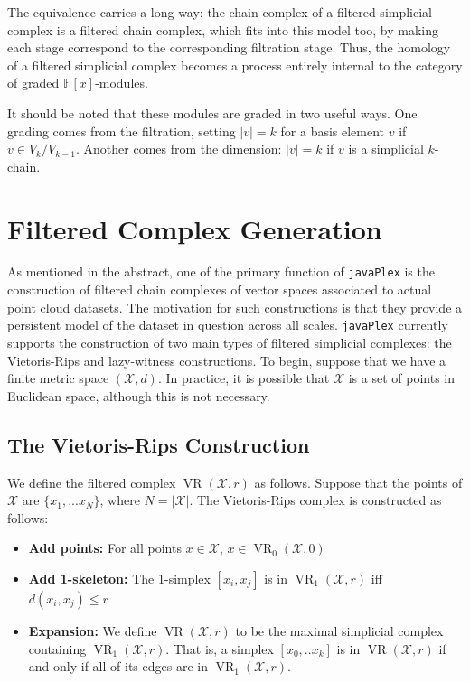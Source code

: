 \documentclass{gts2012}
\newcommand\javaPlex{\texttt{javaPlex}\xspace}
\newcommand{\VR}{\operatorname{VR}}
\begin{document}
The equivalence carries a long way: the chain complex of a filtered
simplicial complex is a filtered chain complex, which fits into this
model too, by making each stage correspond to the corresponding
filtration stage. Thus, the homology of a filtered simplicial complex
becomes a process entirely internal to the category of graded $\mathbb{F}[x]$-modules.

It should be noted that these modules are graded in two useful ways. One grading
comes from the filtration, setting $|v|=k$ for a basis element $v$ if
$v\in V_k/V_{k-1}$. Another comes from the dimension: $|v|=k$ if $v$
is a simplicial $k$-chain.



\section{Filtered Complex Generation}

As mentioned in the abstract, one of the primary function of \javaPlex is the construction of filtered chain complexes of vector spaces associated to actual point cloud datasets. The motivation for such constructions is that they provide a persistent model of the dataset in question across all scales. \javaPlex currently supports the construction of two main types of filtered simplicial complexes: the Vietoris-Rips and lazy-witness constructions. To begin, suppose that we have a finite metric space $(\mathcal{X}, d)$. In practice, it is possible that $\mathcal{X}$ is a set of points in Euclidean space, although this is not necessary.

\subsection{The Vietoris-Rips Construction}
We define the filtered complex $\VR(\mathcal{X}, r)$ as follows. Suppose that the points of $\mathcal{X}$ are $\{x_1, ... x_N\}$, where $N = |\mathcal{X}|$. The Vietoris-Rips complex is constructed as follows:

\begin{itemize}
\item {\bf Add points:} For all points $x \in \mathcal{X}$, $x \in \VR_0(\mathcal{X}, 0)$
\item {\bf Add 1-skeleton:} The 1-simplex $[x_i, x_j]$ is in $\VR_1(\mathcal{X}, r)$ iff $d(x_i, x_j) \leq r$
\item {\bf Expansion:} We define $\VR(\mathcal{X}, r)$ to be the maximal simplicial complex containing $\VR_1(\mathcal{X}, r)$. That is, a simplex $[x_0, .. x_k]$ is in $\VR(\mathcal{X}, r)$ if and only if all of its edges are in $\VR_1(\mathcal{X}, r)$.
\end{itemize}
\end{document}
